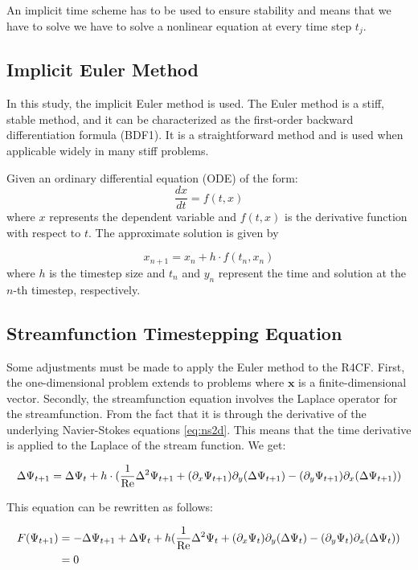 An implicit time scheme has to be used to ensure stability and  means that we
have to solve we have to solve a nonlinear equation at every time step $t_j$. 

\subsection{Implicit Euler Method}

In this study, the implicit Euler method is used. The Euler method is a stiff,
stable method, and it can be characterized as the first-order backward
differentiation formula (BDF1). It is a straightforward method and is used when
applicable widely in many stiff problems.

Given an ordinary differential equation (ODE) of the form: \[ \frac{{dx}}{{dt}}
= f(t, x) \] where $x$ represents the dependent variable and $f(t, x)$ is the
derivative function with respect to $t$. The approximate solution is given by

\[ x_{n+1} = x_n + h \cdot f(t_n, x_n) \] where $h$ is the timestep size and
$t_n$ and $y_n$ represent the time and solution at the $n$-th timestep,
respectively.

\subsection{Streamfunction Timestepping Equation}

Some adjustments must be made to apply the Euler method to the R4CF. First, the
one-dimensional problem extends to problems where $\mathbf{x}$ is a
finite-dimensional vector. Secondly, the streamfunction equation involves the
Laplace operator for the streamfunction. From the fact that it is through the
derivative of the underlying Navier-Stokes equations \eqref{eq:ns2d}. This
means that the time derivative is applied to the Laplace of the stream
function. We get:  

\begin{align}
  \Delta\Psi_{t+1} = \Delta\Psi_t + h \cdot (\frac{1}{\mathrm{Re}}\Delta^2 \Psi_{t+1} +
  (\partial_x \Psi_{t+1}) \partial_y(\Delta \Psi_{t+1}) -
  (\partial_y \Psi_{t+1}) \partial_x(\Delta \Psi_{t+1})) \label{eq:str_timestepping}
\end{align}

This equation can be rewritten as follows:

\begin{align}
  F(\Psi_{t+1}) & = - \Delta\Psi_{t+1} + \Delta\Psi_t + h (\frac{1}{\mathrm{Re}}\Delta^2 \Psi_t +
    (\partial_x \Psi_t) \partial_y(\Delta \Psi_t) -
    (\partial_y \Psi_t) \partial_x(\Delta \Psi_t)) \nonumber \\
  & =  0 \label{eq:newton_ts}
\end{align}


